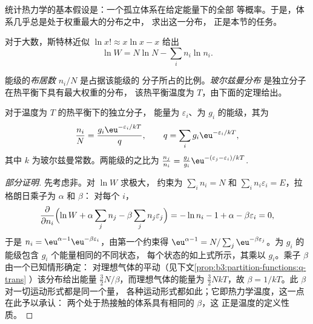 \begin{remark}
统计热力学的基本假设是：一个孤立体系在给定能量下的全部
等概率。于是，体系几乎总是处于权重最大的分布之中，
求出这一分布，
正是本节的任务。
\end{remark}

对于大数，斯特林近似 $\ln x! \approx x\ln x - x$ 给出
\[
  \ln W = N\ln N - \sum_i n_i\ln n_i .
\]

\begin{definition}\label{def:b3:partition-functions:boltzmann}
能级的\emph{布居数} $n_i/N$ 是占据该能级的
分子所占的比例。\emph{玻尔兹曼分布}
是独立分子在热平衡下具有最大权重的分布，
该热平衡温度为 $T$，由下面的定理给出。
\end{definition}

\begin{theorem}[玻尔兹曼分布]\label{thm:b3:partition-functions:boltzmann}
对于温度为 $T$ 的热平衡下的独立分子，
能量为 $\varepsilon_i$、为 $g_i$ 的能级，其为
\[
  \frac{n_i}{N} = \frac{g_i\eu^{-\varepsilon_i/kT}}{q},
  \qquad q = \sum_i g_i\eu^{-\varepsilon_i/kT},
\]
其中 $k$ 为玻尔兹曼常数。两能级的之比为
$\frac{n_j}{n_i} = \frac{g_j}{g_i}\eu^{-(\varepsilon_j - \varepsilon_i)/kT}$.
\end{theorem}

\begin{proof}[部分证明]
先考虑非。对 $\ln W$ 求极大，
约束为 $\sum_in_i = N$ 和 $\sum_in_i\varepsilon_i = E$，拉格朗日乘子为 $\alpha$ 和 $\beta$：
对每个 $i$，
\[
  \frac{\partial}{\partial n_i}\Bigl(\ln W + \alpha\sum_jn_j - \beta\sum_jn_j\varepsilon_j\Bigr)
  = -\ln n_i - 1 + \alpha - \beta\varepsilon_i = 0,
\]
于是 $n_i = \eu^{\alpha - 1}\eu^{-\beta\varepsilon_i}$，由第一个约束得 $\eu^{\alpha - 1}
= N/\sum_j\eu^{-\beta\varepsilon_j}$。为 $g_i$ 的能级包含 $g_i$ 个能量相同的不同状态，
每个状态的如上式所示，其乘以
$g_i$。乘子 $\beta$ 由一个已知情形确定：
对理想气体的平动（见下文\cref{prop:b3:partition-functions:q-trans}
）该分布给出能量 $\frac32N/\beta$，而理想气体的能量为
$\frac32NkT$，故 $\beta = 1/kT$。此 $\beta$ 对一切运动形式都是同一个量，
各种运动形式都如此；它即热力学温度，这一点在此予以承认：
两个处于热接触的体系具有相同的 $\beta$，这
正是温度的定义性质。
\end{proof}

